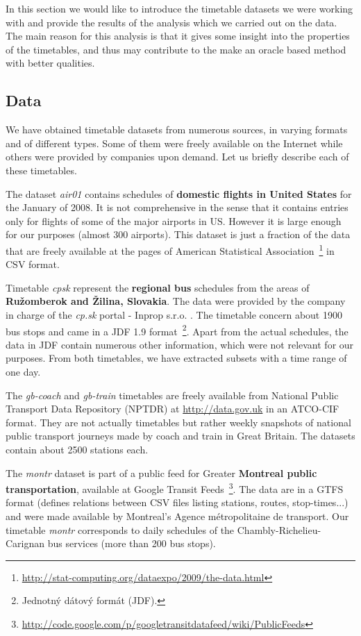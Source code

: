 In this section we would like to introduce the timetable datasets we were working with and provide the results of the analysis which we carried out on the data. The main reason for this analysis is that it gives some insight into the properties of the timetables, and thus may contribute to the make an oracle based method with better qualities.

\subsection{Data}

	We have obtained timetable datasets from numerous sources, in varying formats and of different types. Some of them were freely available on the Internet while others were provided by companies upon demand. Let us briefly describe each of these timetables.
	
	The dataset \textit{air01} contains schedules of \textbf{domestic flights in United States} for the January of 2008. It is not comprehensive in the sense that it contains entries only for flights of some of the major airports in US. However it is large enough for our purposes (almost 300 airports). This dataset is just a fraction of the data that are freely available at the pages of American Statistical Association~\footnote{\url{http://stat-computing.org/dataexpo/2009/the-data.html}} in CSV format.
	
	Timetable \textit{cpsk} represent the \textbf{regional bus} schedules from the areas of \textbf{Ružomberok and Žilina, Slovakia}. The data were provided by the company in charge of the \textit{cp.sk} portal - Inprop s.r.o. . The timetable concern about 1900 bus stops and came in a JDF 1.9 format~\footnote{Jednotný dátový formát (JDF).}. Apart from the actual schedules, the data in JDF contain numerous other information, which were not relevant for our purposes. From both timetables, we have extracted subsets with a time range of one day.
	
	The \textit{gb-coach} and \textit{gb-train} timetables are freely available from National Public Transport Data Repository (NPTDR) at \url{http://data.gov.uk} in an ATCO-CIF format. They are not actually timetables but rather weekly snapshots of national public transport journeys made by coach and train in Great Britain. The datasets contain about 2500 stations each.
	
	The \textit{montr} dataset is part of a public feed for Greater \textbf{Montreal public transportation}, available at Google Transit Feeds~\footnote{\url{http://code.google.com/p/googletransitdatafeed/wiki/PublicFeeds}}. The data are in a GTFS format (defines relations between CSV files listing stations, routes, stop-times...) and were made available by Montreal's Agence métropolitaine de transport. Our timetable \textit{montr} corresponds to daily schedules of the Chambly-Richelieu-Carignan bus services (more than 200 bus stops).
	
